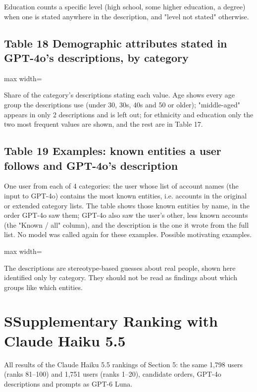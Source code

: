 \documentclass[10pt]{article}
\begin{document}
{\small Education counts a specific level (high school, some higher education, a degree) when one is stated anywhere in the description, and "level not stated" otherwise.}

\subsection*{Table 18 \textperiodcentered{} Demographic attributes stated in GPT-4o's descriptions, by category}
\begin{center}\begin{adjustbox}{max width=\linewidth}

\end{adjustbox}\end{center}

{\small Share of the category's descriptions stating each value. Age shows every age group the descriptions use (under 30, 30s, 40s and 50 or older); "middle-aged" appears in only 2 descriptions and is left out; for ethnicity and education only the two most frequent values are shown, and the rest are in Table 17.}

\subsection*{Table 19 \textperiodcentered{} Examples: known entities a user follows and GPT-4o's description}
One user from each of 4 categories: the user whose list of account names (the input to GPT-4o) contains the most known entities, i.e. accounts in the original or extended category lists. The table shows those known entities by name, in the order GPT-4o saw them; GPT-4o also saw the user's other, less known accounts (the "Known / all" column), and the description is the one it wrote from the full list. No model was called again for these examples. Possible motivating examples.

\begin{center}\begin{adjustbox}{max width=\linewidth}

\end{adjustbox}\end{center}

{\small The descriptions are stereotype-based guesses about real people, shown here identified only by category. They should not be read as findings about which groups like which entities.}

\section*{S\quad Supplementary \textperiodcentered{} Ranking with Claude Haiku 5.5}
All results of the Claude Haiku 5.5 rankings of Section 5: the same 1,798 users (ranks 81--100) and 1,751 users (ranks 1--20), candidate orders, GPT-4o descriptions and prompts as GPT-6 Luna.
\end{document}
